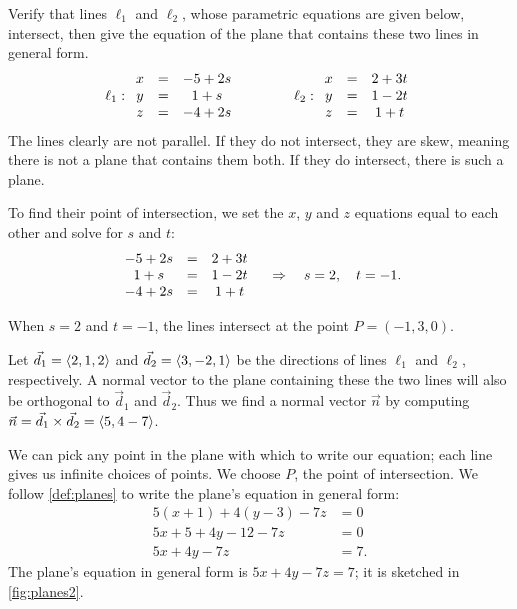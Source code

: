 \begin{example}\label{ex_planes2}%
Verify that lines $\ell_1$ and $\ell_2$, whose parametric equations are given below, intersect, then give the equation of the  plane that contains these two lines in general form.
\[
 \ell_1: \begin{array}{ c c c } x&=&-5+2s \\ y&=&1+s \\ z&=&-4+2s\end{array}
 \qquad\qquad
 \ell_2: \begin{array}{ c c c } x &=& 2+3t\\ y&=&1-2t \\ z&=&1+t\end{array}
\]
\solution
The lines clearly are not parallel. If they do not intersect, they are skew, meaning there is not a plane that contains them both. If they do intersect, there is such a plane. 

To find their point of intersection, we set the $x$, $y$ and $z$ equations equal to each other and solve for $s$ and $t$:
\[
 \begin{array}{ c c c }-5+2s &=&2+3t \\ 1+s &=& 1-2t \\ -4+2s &=& 1+t \end{array}
 \quad  \Rightarrow  \quad s=2,\quad t=-1.
\]

When $s=2$ and $t=-1$, the lines intersect at the point $P= (-1,3,0)$. 

Let $\vec d_1 =\left\langle 2,1,2\right\rangle$ and $\vec d_2=\left\langle 3,-2,1\right\rangle$ be the directions of lines $\ell_1$ and $\ell_2$, respectively. A normal vector to the plane containing these the two lines will also be orthogonal to $\vec d_1$ and $\vec d_2$. Thus we find a normal vector $\vec n$ by computing $\vec n = \vec d_1 \times \vec d_2=\left\langle 5,4-7\right\rangle$.

We can pick any point in the plane with which to write our equation; each line gives us infinite choices of points. We choose $P$, the point of intersection. We follow \autoref{def:planes} to write the plane's equation in general form:
\begin{align*}
5(x+1) +4(y-3) -7z &= 0 \\
5x + 5 + 4y-12 -7z &= 0\\
5x+4y-7z &= 7.
\end{align*}
The plane's equation in general form is $5x+4y-7z=7$; it is sketched in \autoref{fig:planes2}.
\end{example}

